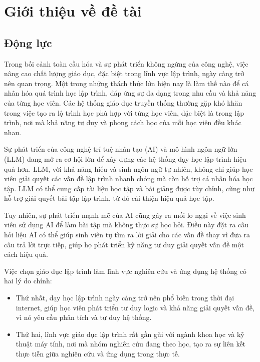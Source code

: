 \chapter{Giới thiệu về đề tài}
\section{Động lực}
Trong bối cảnh toàn cầu hóa và sự phát triển không ngừng của công nghệ, việc nâng cao chất lượng giáo dục, đặc biệt trong lĩnh vực lập trình, ngày càng trở nên quan trọng. Một trong những thách thức lớn hiện nay là làm thế nào để cá nhân hóa quá trình học lập trình, đáp ứng sự đa dạng trong nhu cầu và khả năng của từng học viên. Các hệ thống giáo dục truyền thống thường gặp khó khăn trong việc tạo ra lộ trình học phù hợp với từng học viên, đặc biệt là trong lập trình, nơi mà khả năng tư duy và phong cách học của mỗi học viên đều khác nhau.

Sự phát triển của công nghệ trí tuệ nhân tạo (AI) và mô hình ngôn ngữ lớn (LLM) đang mở ra cơ hội lớn để xây dựng các hệ thống dạy học lập trình hiệu quả hơn. LLM, với khả năng hiểu và sinh ngôn ngữ tự nhiên, không chỉ giúp học viên giải quyết các vấn đề lập trình nhanh chóng mà còn hỗ trợ cá nhân hóa học tập. LLM có thể cung cấp tài liệu học tập và bài giảng được tùy chỉnh, cũng như hỗ trợ giải quyết bài tập lập trình, từ đó cải thiện hiệu quả học tập.

Tuy nhiên, sự phát triển mạnh mẽ của AI cũng gây ra mối lo ngại về việc sinh viên sử dụng AI để làm bài tập mà không thực sự học hỏi. Điều này đặt ra câu hỏi liệu AI có thể giúp sinh viên tự tìm ra lời giải cho các vấn đề thay vì đưa ra câu trả lời trực tiếp, giúp họ phát triển kỹ năng tư duy giải quyết vấn đề một cách hiệu quả.
\par Việc chọn giáo dục lập trình làm lĩnh vực nghiên cứu và ứng dụng hệ thống có hai lý do chính:
\begin{itemize}
    \item Thứ nhất, dạy học lập trình ngày càng trở nên phổ biến trong thời đại internet, giúp học viên phát triển tư duy logic và khả năng giải quyết vấn đề, vì nó yêu cầu phân tích và tư duy hệ thống.
    \item Thứ hai, lĩnh vực giáo dục lập trình rất gần gũi với ngành khoa học và kỹ thuật máy tính, nơi mà nhóm nghiên cứu đang theo học, tạo ra sự liên kết thực tiễn giữa nghiên cứu và ứng dụng trong thực tế.
\end{itemize}

